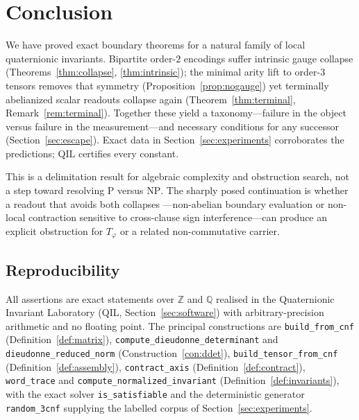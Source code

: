 \documentclass[pdflatex,sn-mathphys-num]{sn-jnl}
\theoremstyle{thmstyleone}%
\theoremstyle{thmstyletwo}%
\theoremstyle{thmstylethree}%
\newcommand{\QQ}{\mathbb{Q}}
\newcommand{\ZZ}{\mathbb{Z}}
\newcommand{\Tphi}{T_{\varphi}}
\begin{document}
\newpage

\section{Conclusion}\label{sec:conclusion}

We have proved exact boundary theorems for a natural family of local
quaternionic invariants. Bipartite order-$2$ encodings suffer intrinsic gauge
collapse (Theorems~\ref{thm:collapse}, \ref{thm:intrinsic}); the minimal
arity lift to order-$3$ tensors removes that symmetry
(Proposition~\ref{prop:nogauge}) yet terminally abelianized scalar readouts
collapse again (Theorem~\ref{thm:terminal}, Remark~\ref{rem:terminal}).
Together these yield a taxonomy---failure in the object versus failure in
the measurement---and necessary conditions for any successor
(Section~\ref{sec:escape}). Exact data in Section~\ref{sec:experiments}
corroborates the predictions; QIL certifies every constant.

This is a delimitation result for algebraic complexity and obstruction
search, not a step toward resolving $\mathrm{P}$ versus $\mathrm{NP}$. The
sharply posed continuation is whether a readout that avoids both collapses
---non-abelian boundary evaluation or non-local contraction sensitive to
cross-clause sign interference---can produce an explicit obstruction for
$\Tphi$ or a related non-commutative carrier.

\subsection*{Reproducibility}

\begin{sloppypar}
All assertions are exact statements over $\ZZ$ and $\QQ$ realised in the
Quaternionic Invariant Laboratory (QIL, Section~\ref{sec:software}) with
arbitrary-precision arithmetic and no floating point.
The principal constructions are \texttt{build\_from\_cnf}
(Definition~\ref{def:matrix}), \texttt{compute\_dieudonne\_determinant} and
\texttt{dieudonne\_reduced\_norm} (Construction~\ref{con:ddet}),
\texttt{build\_tensor\_from\_cnf} (Definition~\ref{def:assembly}),
\texttt{contract\_axis} (Definition~\ref{def:contract}),
\texttt{word\_trace} and \texttt{compute\_normalized\_invariant}
(Definition~\ref{def:invariants}), with the exact solver
\texttt{is\_satisfiable} and the deterministic generator
\texttt{random\_3cnf} supplying the labelled corpus of
Section~\ref{sec:experiments}.
\end{sloppypar}

\newpage

\end{document}

